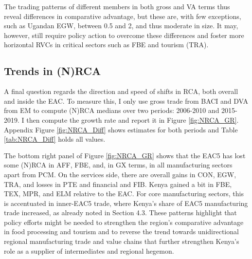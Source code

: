 \documentclass[a4paper]{article}
\begin{document}
The trading patterns of different members in both gross and VA terms thus reveal differences in comparative advantage, but these are, with few exceptions, such as Ugandan EGW, between 0.5 and 2, and thus moderate in size. It may, however, still require policy action to overcome these differences and foster more horizontal RVCs in critical sectors such as FBE and tourism (TRA). 

\subsection{Trends in (N)RCA}

A final question regards the direction and speed of shifts in RCA, both overall and inside the EAC. To measure this, I only use gross trade from BACI and DVA from EM to compute (N)RCA medians over two periods: 2006-2010 and 2015-2019. I then compute the growth rate and report it in Figure \ref{fig:NRCA_GR}. Appendix Figure \ref{fig:NRCA_Diff} shows estimates for both periods and Table \ref{tab:NRCA_Diff} holds all values. \newline

The bottom right panel of Figure \ref{fig:NRCA_GR} shows that the EAC5 has lost some (N)RCA in AFF, FBE, and, in GX terms, in all manufacturing sectors apart from PCM. On the services side, there are overall gains in CON, EGW, TRA, and losses in PTE and financial and FIB. Kenya gained a bit in FBE, TEX, MPR, and ELM relative to the EAC. For core manufacturing sectors, this is accentuated in inner-EAC5 trade, where Kenya's share of EAC5 manufacturing trade increased, as already noted in Section 4.3. These patterns highlight that policy efforts might be needed to strengthen the region's comparative advantage in food processing and tourism and to reverse the trend towards unidirectional regional manufacturing trade and value chains that further strengthen Kenya's role as a supplier of intermediates and regional hegemon. 
\end{document}
